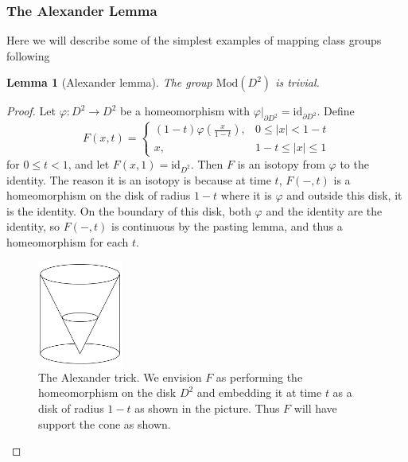 \documentclass[reqno]{amsart}
\newtheorem{lemma}[theorem]{Lemma}
\theoremstyle{definition}
\theoremstyle{remark}
\newcommand{\id}{{\mathrm{id}}}
\newcommand{\Mod}{{\mathrm{Mod}}}
\begin{document}
\subsubsection{The Alexander Lemma}

Here we will describe some of the simplest examples of
mapping class groups following \cite[Chapter 2.1]{Farb-Margalit}

\begin{lemma}[Alexander lemma]
   The group $\Mod\left( D^2 \right) $ is trivial. 
\end{lemma}

\begin{proof}
    Let $\varphi  \colon D^2 \to D^2$ be a homeomorphism
    with $\varphi |_{\partial D^2} = \id_{\partial D^2}$.
    Define 
    \[
    F(x,t) = 
    \begin{cases}
        (1-t) \varphi \left( \frac{x}{1-t} \right) ,& 
        0\le \left| x \right| <1-t\\
        x,& 1-t \le \left| x \right| \le 1
    \end{cases}
    \] 
    for $0\le t < 1$, and let 
    $F(x,1) = \id_{D^2}$. Then $F$ is an isotopy from
    $\varphi $ to the identity. The reason it is an
    isotopy is because at time $t$, $F(-,t)$ is
    a homeomorphism on the disk of
    radius  $1-t$ where it is $\varphi $ and
    outside this disk, it is the identity. On the boundary
    of this disk, both $\varphi $ and the identity are
    the identity, so $F(-,t)$ is continuous by the pasting lemma,
    and thus a homeomorphism for each $t$.

    \begin{figure}[H]
        \centering
        \includegraphics[width=0.25\textwidth]{alexander-trick.png}
        \caption{The Alexander trick. We envision 
        $F$ as performing the homeomorphism on the disk $D^2$ 
    and embedding it at time $t$ as a disk of radius
$1-t$ as shown in the picture. Thus $F$ will have support
the cone as shown.}
        \label{fig:alexander-trick-png}
    \end{figure}
\end{proof}
\end{document}
